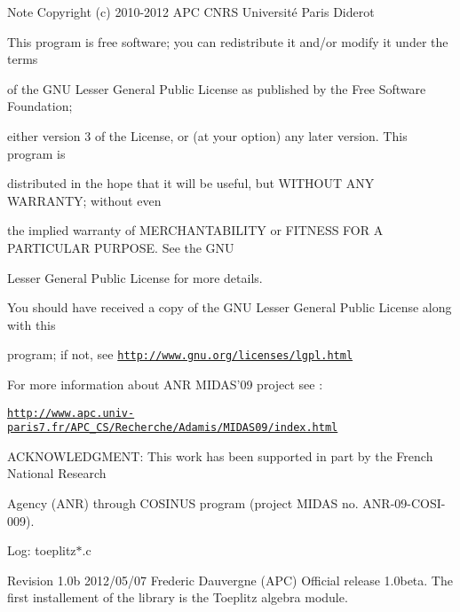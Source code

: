 \begin{DoxyNote}{Note}
Copyright (c) 2010-\/2012 A\-P\-C C\-N\-R\-S Université Paris Diderot 



This program is free software; you can redistribute it and/or modify it under the terms 

of the G\-N\-U Lesser General Public License as published by the Free Software Foundation; 

either version 3 of the License, or (at your option) any later version. This program is 

distributed in the hope that it will be useful, but W\-I\-T\-H\-O\-U\-T A\-N\-Y W\-A\-R\-R\-A\-N\-T\-Y; without even 

the implied warranty of M\-E\-R\-C\-H\-A\-N\-T\-A\-B\-I\-L\-I\-T\-Y or F\-I\-T\-N\-E\-S\-S F\-O\-R A P\-A\-R\-T\-I\-C\-U\-L\-A\-R P\-U\-R\-P\-O\-S\-E. See the G\-N\-U 

Lesser General Public License for more details. 



You should have received a copy of the G\-N\-U Lesser General Public License along with this 

program; if not, see \href{http://www.gnu.org/licenses/lgpl.html}{\tt http\-://www.\-gnu.\-org/licenses/lgpl.\-html} 

For more information about A\-N\-R M\-I\-D\-A\-S'09 project see \-: 

\href{http://www.apc.univ-paris7.fr/APC_CS/Recherche/Adamis/MIDAS09/index.html}{\tt http\-://www.\-apc.\-univ-\/paris7.\-fr/\-A\-P\-C\-\_\-\-C\-S/\-Recherche/\-Adamis/\-M\-I\-D\-A\-S09/index.\-html} 

A\-C\-K\-N\-O\-W\-L\-E\-D\-G\-M\-E\-N\-T\-: This work has been supported in part by the French National Research 

Agency (A\-N\-R) through C\-O\-S\-I\-N\-U\-S program (project M\-I\-D\-A\-S no. A\-N\-R-\/09-\/\-C\-O\-S\-I-\/009).
\end{DoxyNote}
Log\-: toeplitz$\ast$.c

Revision 1.\-0b 2012/05/07 Frederic Dauvergne (A\-P\-C) Official release 1.\-0beta. The first installement of the library is the Toeplitz algebra module.

